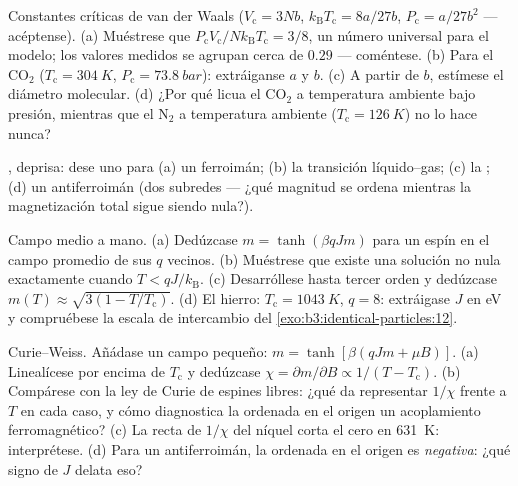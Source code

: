 \begin{exercise}[$\star$]\label{exo:b3:phase-transitions:3}
Constantes críticas de van der Waals ($V_{\text{c}} = 3Nb$,
$k_{\text{B}}T_{\text{c}} = 8a/27b$, $P_{\text{c}} = a/27b^2$ ---
acéptense). (a) Muéstrese que $P_{\text{c}}V_{\text{c}}/Nk_{\text{B}}T_{\text{
c}} = 3/8$, un número universal para el modelo; los valores medidos
se agrupan cerca de $0.29$ --- coméntese. (b) Para el CO$_2$
($T_{\text{c}} = \qty{304}{K}$, $P_{\text{c}} = \qty{73.8}{bar}$):
extráiganse $a$ y $b$. (c) A partir de $b$, estímese el diámetro
molecular. (d) ¿Por qué licua el CO$_2$ a temperatura ambiente bajo
presión, mientras que el N$_2$ a temperatura ambiente ($T_{\text{c}} =
\qty{126}{K}$) no lo hace nunca?
\end{exercise}

\begin{exercise}[$\star$]\label{exo:b3:phase-transitions:4}
, deprisa: dese uno para (a) un ferroimán; (b)
la transición líquido--gas; (c) la ; (d)
un antiferroimán (dos subredes --- ¿qué magnitud se ordena mientras
la magnetización total sigue siendo nula?).
\end{exercise}

\begin{exercise}[$\star\star$]\label{exo:b3:phase-transitions:5}
Campo medio a mano. (a) Dedúzcase $m = \tanh(\beta qJm)$ para un espín
en el campo promedio de sus $q$ vecinos. (b) Muéstrese que existe una solución no
nula exactamente cuando $T < qJ/k_{\text{B}}$. (c) Desarróllese hasta
tercer orden y dedúzcase $m(T) \approx \sqrt{3(1 -
T/T_{\text{c}})}$. (d) El hierro: $T_{\text{c}} = \qty{1043}{K}$, $q =
8$: extráigase $J$ en eV y compruébese la escala de intercambio del
\cref{exo:b3:identical-particles:12}.
\end{exercise}

\begin{exercise}[$\star\star$]\label{exo:b3:phase-transitions:6}
Curie--Weiss. Añádase un campo pequeño: $m = \tanh[\beta(qJm + \mu B)]$.
(a) Linealícese por encima de $T_{\text{c}}$ y dedúzcase $\chi = \partial
m/\partial B \propto 1/(T - T_{\text{c}})$. (b) Compárese con la
ley de Curie de espines libres: ¿qué da representar $1/\chi$ frente a $T$
en cada caso, y cómo diagnostica la ordenada en el origen un acoplamiento
ferromagnético? (c) La recta de $1/\chi$ del níquel corta el cero en \qty{631}{K}:
interprétese. (d) Para un antiferroimán, la ordenada en el origen es
\emph{negativa}: ¿qué signo de $J$ delata eso?
\end{exercise}

